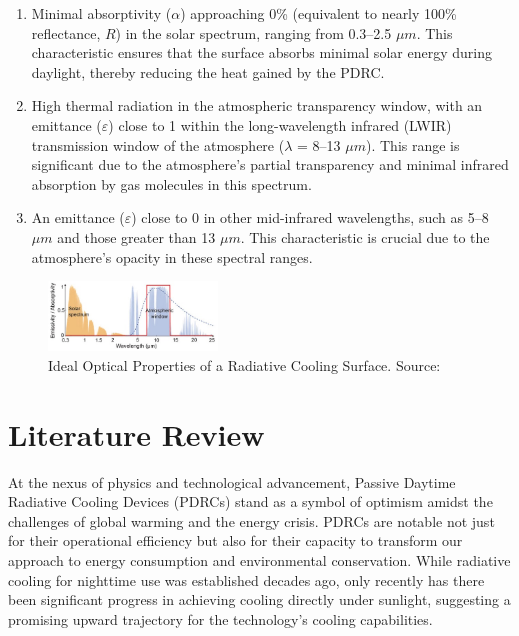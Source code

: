 \begin{enumerate} 
\item Minimal absorptivity ($\alpha$) approaching 0\% (equivalent to nearly 100\% reflectance, $R$) in the solar spectrum, ranging from 0.3–2.5 $\mu m$. This characteristic ensures that the surface absorbs minimal solar energy during daylight, thereby reducing the heat gained by the PDRC.
\item High thermal radiation in the atmospheric transparency window, with an emittance ($\varepsilon$) close to 1 within the long-wavelength infrared (LWIR) transmission window of the atmosphere ($\lambda$ = 8–13 $\mu m$). This range is significant due to the atmosphere's partial transparency and minimal infrared absorption by gas molecules in this spectrum.
\item An emittance ($\varepsilon$) close to 0 in other mid-infrared wavelengths, such as 5–8 $\mu m$ and those greater than 13 $\mu m$. This characteristic is crucial due to the atmosphere's opacity in these spectral ranges.
\end{enumerate}

\begin{figure}[ht!]
  \centering
  \includegraphics[width=0.4\textwidth]{Chapters/Figures/Ideal Optical Properties of a Radiative Cooling Surface.jpg}
  \caption[Ideal Optical Properties of a Radiative Cooling Surface]{Ideal Optical Properties of a Radiative Cooling Surface. Source: \cite{yang_passive_2020}}
  \label{fig:ideal_PDRC_properties}
\end{figure}


\section{Literature Review}
At the nexus of physics and technological advancement, Passive Daytime Radiative Cooling Devices (PDRCs) stand as a symbol of optimism amidst the challenges of global warming and the energy crisis. PDRCs are notable not just for their operational efficiency but also for their capacity to transform our approach to energy consumption and environmental conservation. While radiative cooling for nighttime use was established decades ago, only recently has there been significant progress in achieving cooling directly under sunlight, suggesting a promising upward trajectory for the technology's cooling capabilities.

